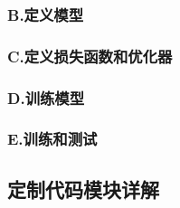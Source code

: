 \subsubsection{B.定义模型}

\subsubsection{C.定义损失函数和优化器}

\subsubsection{D.训练模型}

\subsubsection{E.训练和测试}





\subsection{定制代码模块详解}


\newpage